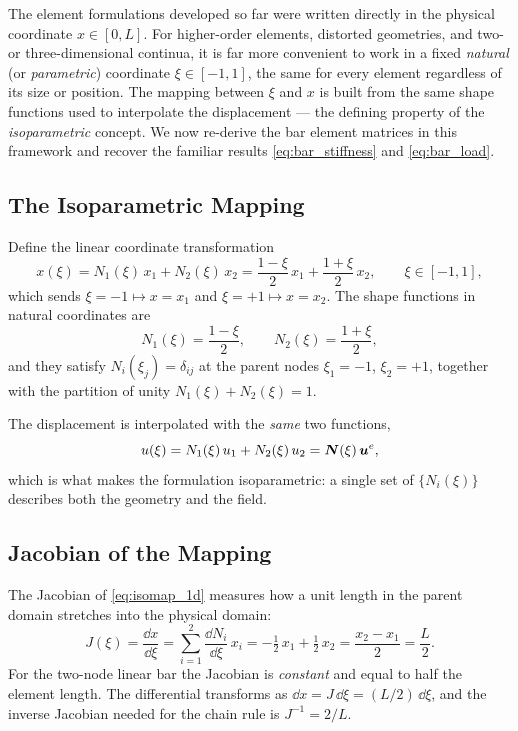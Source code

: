 The element formulations developed so far were written directly in the
physical coordinate $x \in [0, L]$. For higher-order elements, distorted
geometries, and two- or three-dimensional continua, it is far more
convenient to work in a fixed \emph{natural} (or \emph{parametric})
coordinate $\xi \in [-1, 1]$, the same for every element regardless of its
size or position. The mapping between $\xi$ and $x$ is built from the same
shape functions used to interpolate the displacement --- the defining
property of the \emph{isoparametric} concept. We now re-derive the bar
element matrices in this framework and recover the familiar results
\cref{eq:bar_stiffness} and \cref{eq:bar_load}.

\subsection{The Isoparametric Mapping}

Define the linear coordinate transformation
\begin{equation}
    x(\xi) = N_1(\xi)\, x_1 + N_2(\xi)\, x_2
    = \frac{1-\xi}{2}\, x_1 + \frac{1+\xi}{2}\, x_2,
    \qquad \xi \in [-1,1],
    \label{eq:isomap_1d}
\end{equation}
which sends $\xi = -1 \mapsto x = x_1$ and $\xi = +1 \mapsto x = x_2$. The
shape functions in natural coordinates are
\begin{equation}
    N_1(\xi) = \frac{1-\xi}{2}, \qquad N_2(\xi) = \frac{1+\xi}{2},
    \label{eq:bar_shape_xi}
\end{equation}
and they satisfy $N_i(\xi_j) = \delta_{ij}$ at the parent nodes
$\xi_1 = -1$, $\xi_2 = +1$, together with the partition of unity
$N_1(\xi) + N_2(\xi) = 1$.

The displacement is interpolated with the \emph{same} two functions,
\begin{equation}
    u(\xi) = N_1(\xi)\, u_1 + N_2(\xi)\, u_2
    = \bm{N}(\xi)\,\bm{u}^e,
    \label{eq:bar_disp_xi}
\end{equation}
which is what makes the formulation isoparametric: a single set of
$\{N_i(\xi)\}$ describes both the geometry and the field.

\subsection{Jacobian of the Mapping}

The Jacobian of \cref{eq:isomap_1d} measures how a unit length in the
parent domain stretches into the physical domain:
\begin{equation}
    J(\xi) = \frac{\dd x}{\dd\xi}
    = \sum_{i=1}^{2} \frac{\dd N_i}{\dd\xi}\, x_i
    = -\tfrac{1}{2}\, x_1 + \tfrac{1}{2}\, x_2
    = \frac{x_2 - x_1}{2} = \frac{L}{2}.
    \label{eq:jacobian_1d}
\end{equation}
For the two-node linear bar the Jacobian is \emph{constant} and equal to
half the element length. The differential transforms as
$\dd x = J\,\dd\xi = (L/2)\,\dd\xi$, and the inverse Jacobian needed for
the chain rule is $J^{-1} = 2/L$.

